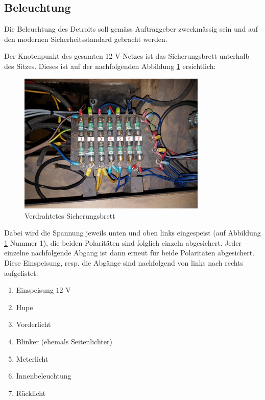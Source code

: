 \subsection{Beleuchtung}

Die Beleuchtung des Detroits soll gemäss Auftraggeber zweckmässig sein und auf den modernen Sicherheitsstandard gebracht werden.

\color{blue}
Der Knotenpunkt des gesamten 12 V-Netzes ist das Sicherungsbrett unterhalb des Sitzes. Dieses ist auf der nachfolgenden Abbildung \ref{fig:Sicherungsbrett} ersichtlich:

\begin{figure}[h!]
	\centering
		\includegraphics[width=0.8\textwidth]{images/Sicherungsbrett}
	\caption{Verdrahtetes Sicherungsbrett}
	\label{fig:Sicherungsbrett}
\end{figure}

\newpage
Dabei wird die Spannung jeweils unten und oben links eingespeist (auf Abbildung \ref{fig:Sicherungsbrett} Nummer 1), die beiden Polaritäten sind folglich einzeln abgesichert. Jeder einzelne nachfolgende Abgang ist dann erneut für beide Polaritäten abgesichert. Diese Einspeisung, resp. die Abgänge sind nachfolgend von links nach rechts aufgelistet:

\begin{enumerate}
\item Einspeisung $12$ V
\item Hupe
\item Vorderlicht
\item Blinker (ehemals Seitenlichter)
\item Meterlicht
\item Innenbeleuchtung
\item Rücklicht
\end{enumerate}


